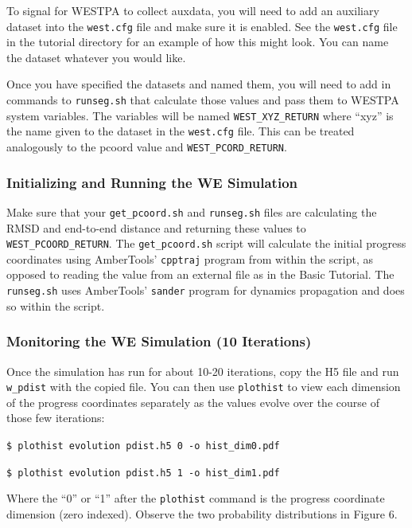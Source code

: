 \documentclass[9pt,tutorial,pubversion]{livecoms}
\begin{document}
To signal for WESTPA to collect auxdata, you will need to add an auxiliary dataset into the \verb|west.cfg| file and make sure it is enabled. 
See the \verb|west.cfg| file in the tutorial directory for an example of how this might look. 
You can name the dataset whatever you would like. 

Once you have specified the datasets and named them, you will need to add in commands to \verb|runseg.sh| that calculate those values and pass them to WESTPA system variables. 
The variables will be named \verb|WEST_XYZ_RETURN| where “xyz” is the name given to the dataset in the \verb|west.cfg| file. 
This can be treated analogously to the pcoord value and \verb|WEST_PCORD_RETURN|.

\subsubsection{Initializing and Running the WE Simulation}

Make sure that your \verb|get_pcoord.sh| and \verb|runseg.sh| files are calculating the RMSD and end-to-end distance and returning these values to \verb|WEST_PCOORD_RETURN|. 
The \verb|get_pcoord.sh| script will calculate the initial progress coordinates using AmberTools’ \verb|cpptraj| program from within the script, as opposed to reading the value from an external file as in the Basic Tutorial.
The \verb|runseg.sh| uses AmberTools’ \verb|sander| program for dynamics propagation and does so within the script.

\subsubsection{Monitoring the WE Simulation (10 Iterations)}

Once the simulation has run for about 10-20 iterations, copy the H5 file and run \verb|w_pdist| with the copied file. 
You can then use \verb|plothist| to view each dimension of the progress coordinates separately as the values evolve over the course of those few iterations:

\verb|$ plothist evolution pdist.h5 0 -o hist_dim0.pdf|

\verb|$ plothist evolution pdist.h5 1 -o hist_dim1.pdf|

Where the “0” or “1” after the \verb|plothist| command is the progress coordinate dimension (zero indexed). 
Observe the two probability distributions in Figure 6.
\end{document}
